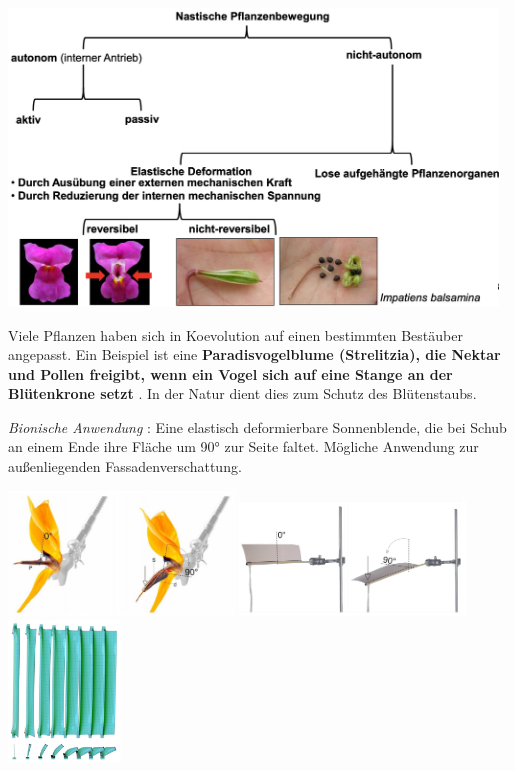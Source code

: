 \begin{center}
    \includegraphics[width=13cm]{lec7/figures/pflanzenbewegung.png}
\end{center}
Viele Pflanzen haben sich in Koevolution auf einen bestimmten Bestäuber angepasst. Ein Beispiel ist eine \textbf{Paradisvogelblume (Strelitzia), die Nektar und Pollen freigibt, wenn ein Vogel sich auf eine Stange an der Blütenkrone setzt} \dangersign. In der Natur dient dies zum Schutz des Blütenstaubs.

\textit{Bionische Anwendung} \dangersign: Eine elastisch deformierbare Sonnenblende, die bei Schub an einem Ende ihre Fläche um 90° zur Seite faltet. Mögliche Anwendung zur außenliegenden Fassadenverschattung.

\begin{center}
    \includegraphics[width=6cm]{lec7/figures/stange.png}
    \hfill
    \includegraphics[width=6cm]{lec7/figures/stange_bio.png}
    \hfill
    \includegraphics[width=3cm]{lec7/figures/sonnenblende.png}
\end{center}

